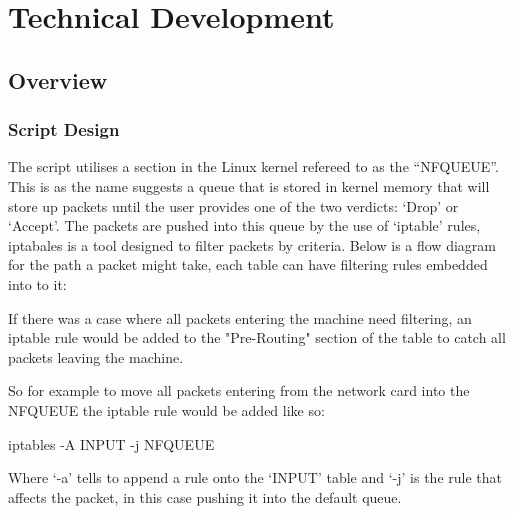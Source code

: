

\chapter{Technical Development}

\section{Overview}
\subsection{Script Design}
The script utilises a section in the Linux kernel refereed to as the ``NFQUEUE''. This is as the name suggests a queue that is stored in kernel memory that will store up packets until the user provides one of the two verdicts: `Drop' or `Accept'. The packets are pushed into this queue by the use of `iptable' rules, iptabales is a tool designed to filter packets by criteria. Below is a flow diagram for the path a packet might take, each table can have filtering rules embedded into to it:



If there was a case where all packets entering the machine need filtering, an iptable rule would be added to the "Pre-Routing" section of the table to catch all packets leaving the machine. 

So for example to move all packets entering from the network card into the NFQUEUE the iptable rule would be added like so:
\begin{center}
	\begin{console_font}
		\large{iptables -A INPUT -j NFQUEUE}
	\end{console_font} 
\end{center}
Where `-a' tells to append a rule onto the `INPUT' table and `-j' is the rule that affects the packet, in this case pushing it into the default queue.

